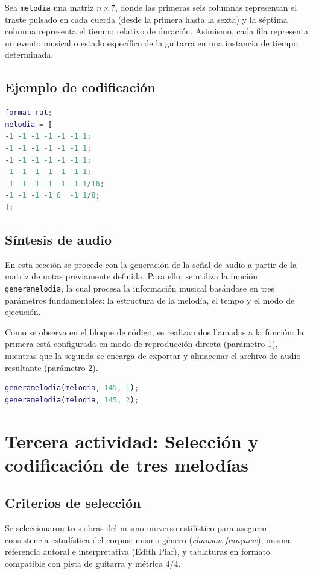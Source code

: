\documentclass{article}
\theoremstyle{plain}
\theoremstyle{definition}
\begin{document}
Sea \texttt{melodia} una matriz $n \times 7$, donde las primeras seis columnas representan el traste pulsado en cada cuerda (desde la primera hasta la sexta) y la séptima columna representa el tiempo relativo de duración. Asimismo, cada fila representa un evento musical o estado específico de la guitarra en una instancia de tiempo determinada.

\subsection*{Ejemplo de codificación}
\begin{lstlisting}[language=Matlab]
format rat;
melodia = [
-1 -1 -1 -1 -1 -1 1;
-1 -1 -1 -1 -1 -1 1;
-1 -1 -1 -1 -1 -1 1;
-1 -1 -1 -1 -1 -1 1;
-1 -1 -1 -1 -1 -1 1/16;
-1 -1 -1 -1 8  -1 1/8;
];
\end{lstlisting}

\subsection*{Síntesis de audio}

En esta sección se procede con la generación de la señal de audio a partir de la matriz de notas previamente definida. Para ello, se utiliza la función \texttt{generamelodia}, la cual procesa la información musical basándose en tres parámetros fundamentales: la estructura de la melodía, el tempo y el modo de ejecución. 

Como se observa en el bloque de código, se realizan dos llamadas a la función: la primera está configurada en modo de reproducción directa (parámetro 1), mientras que la segunda se encarga de exportar y almacenar el archivo de audio resultante (parámetro 2).

\begin{lstlisting}[language=Matlab]
generamelodia(melodia, 145, 1);
generamelodia(melodia, 145, 2);
\end{lstlisting}

\section*{Tercera actividad: Selección y codificación de tres melodías}
\subsection*{Criterios de selección}
Se seleccionaron tres obras del mismo universo estilístico para asegurar consistencia estadística del corpus: mismo género (\textit{chanson française}), misma referencia autoral e interpretativa (Edith Piaf), y tablaturas en formato compatible con pista de guitarra y métrica \(4/4\). 
\end{document}
